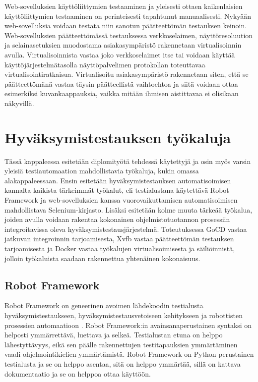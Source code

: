   Web-sovelluksien käyttöliittymien testaaminen ja yleisesti ottaen kaikenlaisien käyttöliittymien testaaminen on perinteisesti tapahtunut manuaalisesti.
  Nykyään web-sovelluksia voidaan testata niin sanotun päätteettömän testauksen keinoin.
  Web-sovelluksien päätteettömässä testauksessa verkkoselaimen, näyttöresoluution ja selainasetuksien muodostama asiakasympäristö rakennetaan virtualisoinnin avulla.
  Virtualisoinnista vastaa joko verkkoselaimet itse tai voidaan käyttää käyttöjärjestelmätasolla näyttöpalvelimen protokollan toteuttavaa virtualisointiratkaisua.
  Virtualisoitu asiakasympäristö rakennetaan siten, että se päätteettömänä vastaa täysin päätteellistä vaihtoehtoa ja siitä voidaan ottaa esimerkiksi kuvankaappauksia, vaikka mitään ihmisen aistittavaa ei olisikaan näkyvillä.

\section{Hyväksymistestauksen työkaluja} \label{ch:08_hyvaksymistestauksen_tyokaluja}

  Tässä kappaleessa esitetään diplomityötä tehdessä käytettyjä ja osin myös varsin yleisiä testiautomaation mahdollistavia työkaluja, kukin omassa alakappaleessaan.
  Ensin esitetään hyväksymistestauksen automatisoimisen kannalta kaikista tärkeimmät työkalut, eli testialustana käytettävä Robot Framework ja web-sovelluksien kanssa vuorovaikuttamisen automatisoimisen mahdollistava Selenium-kirjasto.
  Lisäksi esitetään kolme muuta tärkeää työkalua, joiden avulla voidaan rakentaa kokonainen ohjelmistotuotannon prosessiin integroitavissa oleva hyväksymistestausjärjestelmä.
  Toteutuksessa GoCD vastaa jatkuvan integroinnin tarjoamisesta, Xvfb vastaa päätteettömän testauksen tarjoamisesta ja Docker vastaa työkalujen virtualisoimisesta ja säiliöinnistä, jolloin työkaluista saadaan rakennettua yhtenäinen kokonaisuus.

  \subsection{Robot Framework} \label{ch:08_robot_framework}

    Robot Framework on geneerinen avoimen lähdekoodin testialusta hyväksymistestaukseen, hyväksymistestausvetoiseen kehitykseen ja robottisten prosessien automaatioon \parencite{noauthor_robot_nodate}.
    Robot Framework:in avainsanaperustainen syntaksi on helposti ymmärrettävä, luettava ja selkeä.
    Testialustan etuna on helppo lähestyttävyys, eikä sen päälle rakennettujen testitapauksien ymmärtäminen vaadi ohjelmointikielien ymmärtämistä.
    Robot Framework on Python-perustainen testialusta ja se on helppo asentaa, sitä on helppo ymmärtää, sillä on kattava dokumentaatio ja se on helppoa ottaa käyttöön.

